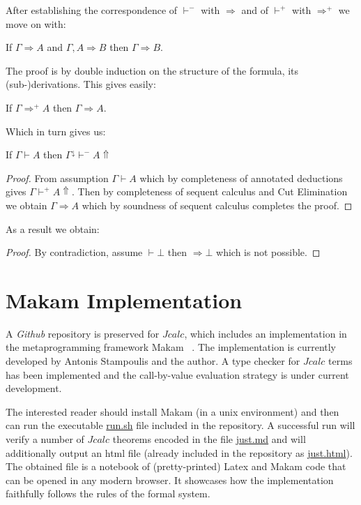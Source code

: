 After establishing the correspondence of $\vdash^{-}$ with $\Rightarrow$ and of $\vdash^{+}$ with $\Rightarrow^{+}$ we move on with:
\begin{theorem}
	If $\Gamma\Rightarrow A$ and $\Gamma,A\Rightarrow B$ then $\Gamma\Rightarrow B$.
\end{theorem}
The proof is by double induction on the structure of the formula, its (sub-)derivations. This gives easily:
\begin{theorem}
	If $\Gamma\Rightarrow^{+}A$ then $\Gamma\Rightarrow A$.
	
\end{theorem}
Which in turn gives us:
\begin{theorem}
	\label{normalization}
	If $\Gamma\vdash A$ then $\Gamma^{\downarrow}\vdash^{-} A\Uparrow$
\end{theorem}
\begin{proof}
	From assumption $\Gamma \vdash A$ which by completeness of annotated deductions gives $\Gamma\vdash^{+} A\Uparrow$. 
	Then by completeness of sequent calculus  and Cut  Elimination we obtain $\Gamma\Rightarrow A$ 
	which by  soundness of sequent calculus completes the proof.
\end{proof}
As a result we obtain:
\begin{proof}
	By contradiction, assume $\vdash\bot$ then $\Rightarrow \bot$ which is not possible.
\end{proof}
\chapter{Makam Implementation}
A \textit{Github} repository \cite{jcalcrepo} is preserved for $Jcalc$, which includes an implementation in the
metaprogramming framework {\sf Makam} ~\cite{stampoulis}. 
The implementation is currently developed by Antonis Stampoulis and
the author. A type checker for $Jcalc$ terms has been implemented and the call-by-value evaluation
strategy is under current development. 

The interested reader should install {\sf Makam}
(in a unix environment) and then  can run the executable \url{run.sh} 
file included in the repository. 
A successful run will verify a number of $Jcalc$  theorems encoded in the file \url{just.md} 
and will  additionally output an html file 
(already included in the repository as \url{just.html}).
The obtained file is a notebook of (pretty-printed) {\sf Latex} and {\sf Makam} code 
that can be opened in any modern browser.
It showcases how the implementation faithfully follows the rules 
of the formal system.  